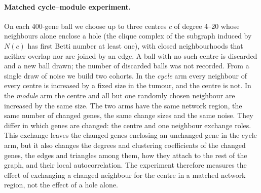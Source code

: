 \paragraph{Matched cycle--module experiment.} On each 400-gene ball we choose up to three centres $c$ of degree 4--20 whose neighbours alone enclose a hole (the clique complex of the subgraph induced by $N(c)$ has first Betti number at least one), with closed neighbourhoods that neither overlap nor are joined by an edge. A ball with no such centre is discarded and a new ball drawn; the number of discarded balls was not recorded. From a single draw of noise we build two cohorts. In the \emph{cycle} arm every neighbour of every centre is increased by a fixed size in the tumour, and the centre is not. In the \emph{module} arm the centre and all but one randomly chosen neighbour are increased by the same size. The two arms have the same network region, the same number of changed genes, the same change sizes and the same noise. They differ in which genes are changed: the centre and one neighbour exchange roles. This exchange leaves the changed genes enclosing an unchanged gene in the cycle arm, but it also changes the degrees and clustering coefficients of the changed genes, the edges and triangles among them, how they attach to the rest of the graph, and their local autocorrelation. The experiment therefore measures the effect of exchanging a changed neighbour for the centre in a matched network region, not the effect of a hole alone.

